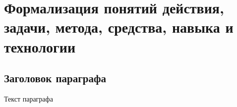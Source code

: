 \chapter{Формализация понятий действия, задачи, метода, средства, навыка и технологии}
\label{chapter_actions}


\section{Заголовок параграфа}
Текст параграфа

%